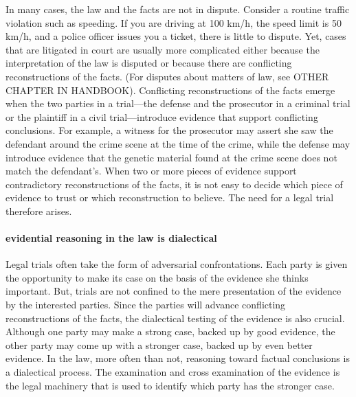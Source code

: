 \documentclass[10pt]{article}
\begin{document}
In many cases, the law and the facts are not in dispute. Consider a routine traffic violation such as speeding. 
If you are driving at 100 km/h, the speed limit is 50 km/h, and a police officer issues you a ticket, 
there is  little to dispute. Yet, cases that are litigated in court are usually more complicated either because the interpretation of 
the law is disputed or because there are conflicting reconstructions of the facts. 
(For disputes about matters of law, see OTHER CHAPTER IN HANDBOOK).
Conflicting reconstructions of the facts emerge when the two parties in a trial---the defense and the prosecutor in a criminal trial or 
the plaintiff in a civil trial---introduce evidence that support conflicting conclusions. 
For example, a witness for the prosecutor may assert she saw the defendant around the crime scene at the time of the crime, 
while the defense may introduce evidence that the genetic material found at the crime scene does not match the defendant's.
When two or more pieces of evidence support contradictory reconstructions of the facts, it is not easy 
to decide which piece of evidence to trust or which reconstruction to believe. The need for a legal trial therefore arises. 


\paragraph{evidential reasoning in the law is dialectical} 

Legal trials often take the form of adversarial confrontations.  Each party is given the opportunity to make its case on the basis of the evidence she thinks important. But, 
trials are not confined to the mere presentation of the 
evidence by the interested parties. Since the parties will advance conflicting reconstructions of the facts, 
the dialectical testing of the evidence is also crucial. 
Although one party may make a strong case, backed up by good evidence, %
the other party may come up with a stronger case, backed up by even better evidence.  In the law, more often than not, reasoning toward factual 
conclusions is a dialectical process. The examination and cross examination of the evidence 
is the legal machinery that is used to identify which party has the stronger case.
\end{document}
